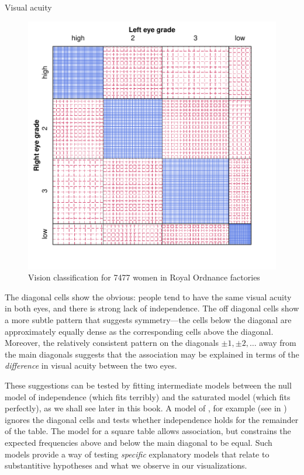 \documentclass[11pt]{book}\usepackage[]{graphicx}\usepackage[]{color}
\newenvironment{knitrout}{}{} %
\renewenvironment{knitrout}{\small\renewcommand{\baselinestretch}{.85}}{} %
\begin{document}
\begin{Example}[vision1]{Visual acuity}
\begin{knitrout}
\begin{figure}[htbp]
\centerline{\includegraphics[width=.7\textwidth]{ch04/fig/VA-sieve2} }

\caption[Vision classification for 7477 women in Royal Ordnance factories]{Vision classification for 7477 women in Royal Ordnance factories\label{fig:VA-sieve2}}
\end{figure}


\end{knitrout}


The diagonal cells show the obvious:
people tend to have the same visual acuity in both eyes, and there is
strong lack of independence.  The off diagonal cells show a more subtle
pattern that suggests symmetry---the cells below the diagonal
are approximately equally dense as the corresponding cells above the diagonal.
Moreover, the relatively consistent pattern on the diagonals
$\pm 1, \pm 2, \dots$ away from the main diagonals suggests
that the association may be explained in terms of the \emph{difference}
in visual acuity between the two eyes.

These suggestions can be tested by fitting  intermediate models
between the null model of independence (which fits terribly)
and the saturated model (which fits perfectly),
as we shall see later in this book.
A model of , for example 
(see  in )
ignores the diagonal cells and tests whether independence holds
for the remainder of the table.  
The  model for a square table allows association,
but constrains the expected frequencies above and below the
main diagonal to be equal.
Such models provide a
way of testing \emph{specific} explanatory models that relate to
substantitive hypotheses and what we observe in our visualizations.
\end{Example}
\end{document}
